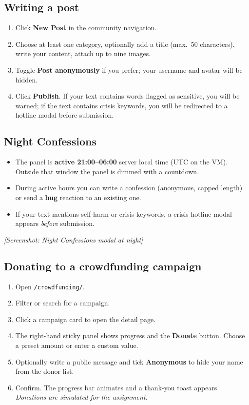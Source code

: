 \subsection{Writing a post}
\begin{enumerate}
  \item Click \textbf{New Post} in the community navigation.
  \item Choose at least one category, optionally add a title
        (max.~50 characters), write your content, attach up to nine
        images.
  \item Toggle \textbf{Post anonymously} if you prefer; your username
        and avatar will be hidden.
  \item Click \textbf{Publish}. If your text contains words flagged as
        sensitive, you will be warned; if the text contains crisis
        keywords, you will be redirected to a hotline modal before
        submission.
\end{enumerate}

\subsection{Night Confessions}
\begin{itemize}
  \item The panel is \textbf{active 21:00–06:00} server local time
        (UTC on the VM). Outside that window the panel is dimmed with a
        countdown.
  \item During active hours you can write a confession (anonymous,
        capped length) or send a \textbf{hug} reaction to an existing
        one.
  \item If your text mentions self-harm or crisis keywords, a crisis
        hotline modal appears \emph{before} submission.
\end{itemize}

\textit{[Screenshot: Night Confessions modal at night]}

\subsection{Donating to a crowdfunding campaign}
\begin{enumerate}
  \item Open \texttt{/crowdfunding/}.
  \item Filter or search for a campaign.
  \item Click a campaign card to open the detail page.
  \item The right-hand sticky panel shows progress and the
        \textbf{Donate} button. Choose a preset amount or enter a custom
        value.
  \item Optionally write a public message and tick \textbf{Anonymous} to
        hide your name from the donor list.
  \item Confirm. The progress bar animates and a thank-you toast
        appears. \emph{Donations are simulated for the assignment.}
\end{enumerate}

